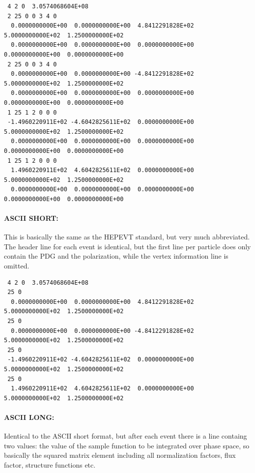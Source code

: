 \documentclass[12pt]{book}
\begin{document}
\begin{scriptsize}
  \begin{verbatim}
 4 2 0  3.0574068604E+08
 2 25 0 0 3 4 0
  0.0000000000E+00  0.0000000000E+00  4.8412291828E+02  5.0000000000E+02  1.2500000000E+02
  0.0000000000E+00  0.0000000000E+00  0.0000000000E+00  0.0000000000E+00  0.0000000000E+00
 2 25 0 0 3 4 0
  0.0000000000E+00  0.0000000000E+00 -4.8412291828E+02  5.0000000000E+02  1.2500000000E+02
  0.0000000000E+00  0.0000000000E+00  0.0000000000E+00  0.0000000000E+00  0.0000000000E+00
 1 25 1 2 0 0 0
 -1.4960220911E+02 -4.6042825611E+02  0.0000000000E+00  5.0000000000E+02  1.2500000000E+02
  0.0000000000E+00  0.0000000000E+00  0.0000000000E+00  0.0000000000E+00  0.0000000000E+00
 1 25 1 2 0 0 0
  1.4960220911E+02  4.6042825611E+02  0.0000000000E+00  5.0000000000E+02  1.2500000000E+02
  0.0000000000E+00  0.0000000000E+00  0.0000000000E+00  0.0000000000E+00  0.0000000000E+00
  \end{verbatim}
\end{scriptsize}

\paragraph{ASCII SHORT:}

This is basically the same as the HEPEVT standard, but very much
abbreviated. The header line for each event is identical, but the first
line per particle does only contain the PDG and the polarization,
while the vertex information line is omitted.

\begin{scriptsize}
  \begin{verbatim}
 4 2 0  3.0574068604E+08
 25 0
  0.0000000000E+00  0.0000000000E+00  4.8412291828E+02  5.0000000000E+02  1.2500000000E+02
 25 0
  0.0000000000E+00  0.0000000000E+00 -4.8412291828E+02  5.0000000000E+02  1.2500000000E+02
 25 0
 -1.4960220911E+02 -4.6042825611E+02  0.0000000000E+00  5.0000000000E+02  1.2500000000E+02
 25 0
  1.4960220911E+02  4.6042825611E+02  0.0000000000E+00  5.0000000000E+02  1.2500000000E+02
  \end{verbatim}
\end{scriptsize}

\paragraph{ASCII LONG:}

Identical to the ASCII short format, but after each event there is a
line containg two values: the value of the sample function to be
integrated over phase space, so basically the squared matrix element
including all normalization factors, flux factor, structure functions
etc.
\end{document}
